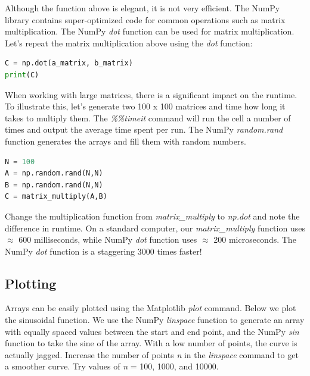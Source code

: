 \documentclass[a4paper , 12pt]{book}
\begin{document}
Although the function above is elegant, it is not very efficient. The NumPy library contains super-optimized code for common operations such as matrix multiplication. The NumPy \textit{dot} function can be used for matrix multiplication. Let's repeat the matrix multiplication above using the \textit{dot} function:

\begin{center}
\begin{lstlisting}[language=Python, frame=single]
C = np.dot(a_matrix, b_matrix)
print(C)
\end{lstlisting}
\end{center}

When working with large matrices, there is a significant impact on the runtime. To illustrate this, let's generate two 100 x 100 matrices and time how long it takes to multiply them. The \textit{\%\%timeit} command will run the cell a number of times and output the average time spent per run. The NumPy \textit{random.rand} function generates the arrays and fill them with random numbers.

\begin{center}
\begin{lstlisting}[language=Python, frame=single]
%%timeit
N = 100
A = np.random.rand(N,N)
B = np.random.rand(N,N)
C = matrix_multiply(A,B)
\end{lstlisting}
\end{center}

Change the multiplication function from \textit{matrix\_multiply} to \textit{np.dot} and note the difference in runtime. On a standard computer, our \textit{matrix\_multiply} function uses $\approx$ 600 milliseconds, while NumPy \textit{dot} function uses $\approx$ 200 microseconds. The NumPy \textit{dot} function is a staggering 3000 times faster!

\subsection{Plotting}

Arrays can be easily plotted using the Matplotlib \textit{plot} command. Below we plot the sinusoidal function. We use the NumPy \textit{linspace} function to generate an array with equally spaced values between the start and end point, and the NumPy \textit{sin} function to take the sine of the array. With a low number of points, the curve is actually jagged. Increase the number of points \textit{n} in the \textit{linspace} command to get a smoother curve. Try values of \textit{n} = 100, 1000, and 10000.
\end{document}
